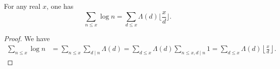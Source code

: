 \begin{lemma}
\label{Mertens-sum-log-eq-sum-mangoldt}
\leanok
For any real $x$, one has
$$ \sum_{n \leq x} \log n = \sum_{d \leq x} \Lambda(d) \lfloor \frac{x}{d} \rfloor.$$
\end{lemma}
\begin{proof}
\leanok
We have
\begin{align*}
\sum_{n \leq x} \log n
&= \sum_{n \leq x} \sum_{d \mid n} \Lambda(d)
= \sum_{d \leq x} \Lambda(d) \sum_{n \leq x, d \mid n} 1
= \sum_{d \leq x} \Lambda(d) \left\lfloor \frac{x}{d} \right\rfloor.
\end{align*}
\end{proof}

